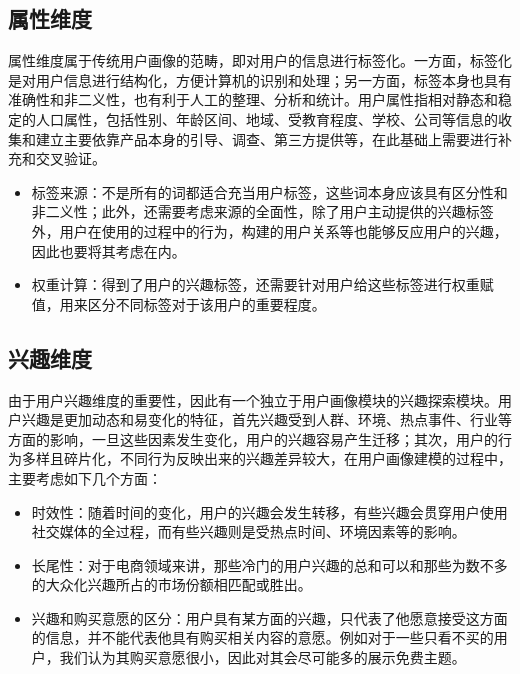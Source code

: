         \subsection{属性维度}
        属性维度属于传统用户画像的范畴，即对用户的信息进行标签化。一方面，标签化是对用户信息进行结构化，方便计算机的识别和处理；另一方面，标签本身也具有准确性和非二义性，也有利于人工的整理、分析和统计。用户属性指相对静态和稳定的人口属性，包括性别、年龄区间、地域、受教育程度、学校、公司等信息的收集和建立主要依靠产品本身的引导、调查、第三方提供等，在此基础上需要进行补充和交叉验证。
        \begin{itemize}
        \item 标签来源：不是所有的词都适合充当用户标签，这些词本身应该具有区分性和非二义性；此外，还需要考虑来源的全面性，除了用户主动提供的兴趣标签外，用户在使用的过程中的行为，构建的用户关系等也能够反应用户的兴趣，因此也要将其考虑在内。
        \item 权重计算：得到了用户的兴趣标签，还需要针对用户给这些标签进行权重赋值，用来区分不同标签对于该用户的重要程度。
        \end{itemize}

        \subsection{兴趣维度}
        由于用户兴趣维度的重要性，因此有一个独立于用户画像模块的兴趣探索模块。用户兴趣是更加动态和易变化的特征，首先兴趣受到人群、环境、热点事件、行业等方面的影响，一旦这些因素发生变化，用户的兴趣容易产生迁移；其次，用户的行为多样且碎片化，不同行为反映出来的兴趣差异较大，在用户画像建模的过程中，主要考虑如下几个方面：
        \begin{itemize}
        \item 时效性：随着时间的变化，用户的兴趣会发生转移，有些兴趣会贯穿用户使用社交媒体的全过程，而有些兴趣则是受热点时间、环境因素等的影响。
        \item 长尾性：对于电商领域来讲，那些冷门的用户兴趣的总和可以和那些为数不多的大众化兴趣所占的市场份额相匹配或胜出。
        \item 兴趣和购买意愿的区分：用户具有某方面的兴趣，只代表了他愿意接受这方面的信息，并不能代表他具有购买相关内容的意愿。例如对于一些只看不买的用户，我们认为其购买意愿很小，因此对其会尽可能多的展示免费主题。
        \end{itemize}

